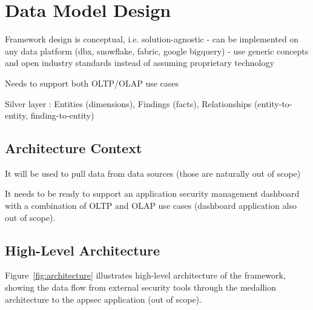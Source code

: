 \chapter{Data Model Design}
\label{ch:model-design}

Framework design is conceptual, i.e. solution-agnostic - can be implemented on any data platform (dbx, snowflake, fabric, google bigquery) - use generic concepts and open industry standards instead of assuming proprietary technology

Needs to support both OLTP/OLAP use cases

Silver layer : Entities (dimensions), Findings (facts), Relationships (entity-to-entity, finding-to-entity)

\section{Architecture Context}

It will be used to pull data from data sources (those are naturally out of scope)

It needs to be ready to support an application security management dashboard with a combination of OLTP and OLAP use cases (dashboard application also out of scope).

\section{High-Level Architecture}

Figure~\ref{fig:architecture} illustrates high-level architecture of the framework, showing the data flow from external security tools through the medallion architecture to the appsec application (out of scope).

